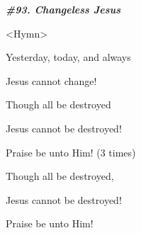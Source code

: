 
{\LARGE{}\textit{\textbf{\#93. Changeless Jesus}}}

{\LARGE{}<Hymn>}

{\LARGE{}Yesterday, today, and always}

{\LARGE{}Jesus cannot change!}

{\LARGE{}Though all be destroyed}

{\LARGE{}Jesus cannot be destroyed!}

{\LARGE{}Praise be unto Him! (3 times)}

{\LARGE{}Though all be destroyed,}

{\LARGE{}Jesus cannot be destroyed!}

{\LARGE{}Praise be unto Him!}


